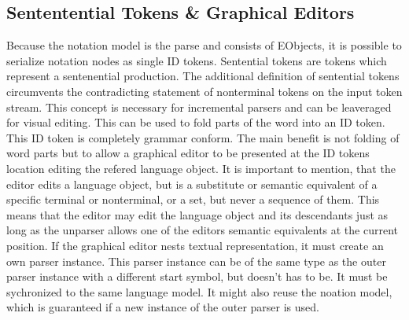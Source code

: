 \subsection{Sententential Tokens \& Graphical Editors}
Because the notation model is the parse and consists of EObjects, it is possible to serialize notation nodes as single ID tokens. Sentential tokens are tokens which represent a sentenential production. The additional definition of sentential tokens circumvents the contradicting statement of nonterminal tokens on the input token stream. This concept is necessary for incremental parsers and can be leaveraged for visual editing. This can be used to fold parts of the word into an ID token. This ID token is completely grammar conform. The main benefit is not folding of word parts but to allow a graphical editor to be presented at the ID tokens location editing the refered language object. It is important to mention, that the editor edits a language object, but is a substitute or semantic equivalent of a specific terminal or nonterminal, or a set, but never a sequence of them. This means that the editor may edit the language object and its descendants just as long as the unparser allows one of the editors semantic equivalents at the current position. If the graphical editor nests textual representation, it must create an own parser instance. This parser instance can be of the same type as the outer parser instance with a different start symbol, but doesn't has to be. It must be sychronized to the same language model. It might also reuse the noation model, which is guaranteed if a new instance of the outer parser is used.

 \\
 \\
 \\
 \\